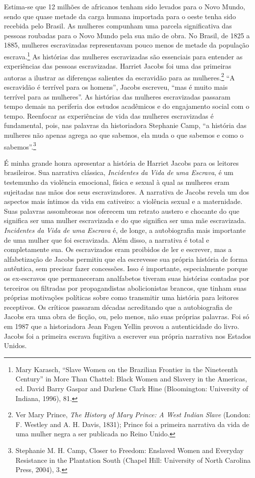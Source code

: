 Estima-se que 12 milhões de africanos tenham sido levados para o Novo
Mundo, sendo que quase metade da carga humana importada para o oeste
tenha sido recebida pelo Brasil. As mulheres compunham uma parcela
significativa das pessoas roubadas para o Novo Mundo pela sua mão de
obra. No Brasil, de 1825 a 1885, mulheres escravizadas representavam
pouco menos de metade da população escrava.\footnote{Mary Karasch,
  ``Slave Women on the Brazilian Frontier in the Nineteenth Century'' in
  More Than Chattel: Black Women and Slavery in the Americas, ed. David
  Barry Gaspar and Darlene Clark Hine (Bloomington: University of
  Indiana, 1996), 81.} As histórias das mulheres escravizadas são
essenciais para entender as experiências das pessoas escravizadas.
Harriet Jacobs foi uma das primeiras autoras a ilustrar as diferenças
salientes da escravidão para as mulheres.\footnote{Ver Mary Prince,
  \emph{The History of Mary Prince: A West Indian Slave} (London: F.
  Westley and A. H. Davis, 1831); Prince foi a primeira narrativa da
  vida de uma mulher negra a ser publicada no Reino Unido.} ``A
escravidão é terrível para os homens'', Jacobs escreveu, ``mas é muito
mais terrível para as mulheres''. As histórias das mulheres escravizadas
passaram tempo demais na periferia dos estudos acadêmicos e do
engajamento social com o tempo. Reenfocar as experiências de vida das
mulheres escravizadas é fundamental, pois, nas palavras da historiadora
Stephanie Camp, ``a história das mulheres não apenas agrega ao que
sabemos, ela muda o que sabemos e como o sabemos''.\footnote{Stephanie
  M. H. Camp, Closer to Freedom: Enslaved Women and Everyday Resistance
  in the Plantation South (Chapel Hill: University of North Carolina
  Press, 2004), 3.}

É minha grande honra apresentar a história de Harriet Jacobs para os
leitores brasileiros. Sua narrativa clássica, \emph{Incidentes da Vida
de uma Escrava}, é um testemunho da violência emocional, física e sexual
à qual as mulheres eram sujeitadas nas mãos dos seus escravizadores. A
narrativa de Jacobs revela um dos aspectos mais íntimos da vida em
cativeiro: a violência sexual e a maternidade. Suas palavras assombrosas
nos oferecem um retrato austero e chocante do que significa ser uma
mulher escravizada e do que significa ser uma mãe escravizada.
\emph{Incidentes da Vida de uma Escrava} é, de longe, a autobiografia
mais importante de uma mulher que foi escravizada. Além disso, a
narrativa é total e completamente sua. Os escravizados eram proibidos de
ler e escrever, mas a alfabetização de Jacobs permitiu que ela
escrevesse sua própria história de forma autêntica, sem precisar fazer
concessões. Isso é importante, especialmente porque os ex-escravos que
permaneceram analfabetos tiveram suas histórias contadas por terceiros
ou filtradas por propagandistas abolicionistas brancos, que tinham suas
próprias motivações políticas sobre como transmitir uma história para
leitores receptivos. Os críticos passaram décadas acreditando que a
autobiografia de Jacobs era uma obra de ficção, ou, pelo menos, não suas
próprias palavras. Foi só em 1987 que a historiadora Jean Fagen Yellin
provou a autenticidade do livro. Jacobs foi a primeira escrava fugitiva
a escrever sua própria narrativa nos Estados Unidos.

